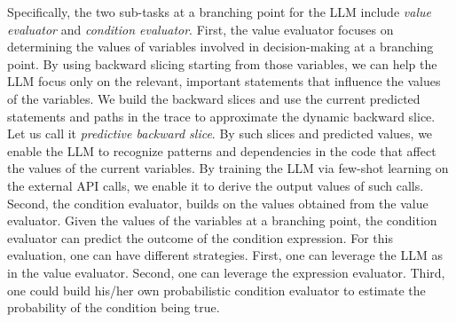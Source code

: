 Specifically, the two sub-tasks at a branching point for the LLM
include {\em value evaluator} and {\em condition evaluator}. First, the value
evaluator focuses on determining the values of variables involved in
decision-making at a branching point. By using backward slicing
starting from those variables, we can help the LLM focus only on the
relevant, important statements that influence the values of the
variables. We build the backward slices and use the current predicted
statements and paths in the trace to approximate the dynamic backward
slice. Let us call it {\em predictive backward slice}. By such slices
and predicted values, we enable the LLM to recognize patterns and
dependencies in the code that affect the values of the current
variables. By training the LLM via few-shot learning on the external
API calls, we enable it to derive the output values of such calls.
Second, the condition evaluator, builds on the values obtained from
the value evaluator. Given the values of the variables at a branching
point, the condition evaluator can predict the outcome of the
condition expression. For this evaluation, one can have different
strategies. First, one can leverage the LLM as in the value
evaluator. Second, one can leverage the expression evaluator. Third,
one could build his/her own probabilistic condition evaluator to
estimate the probability of the condition being true.




